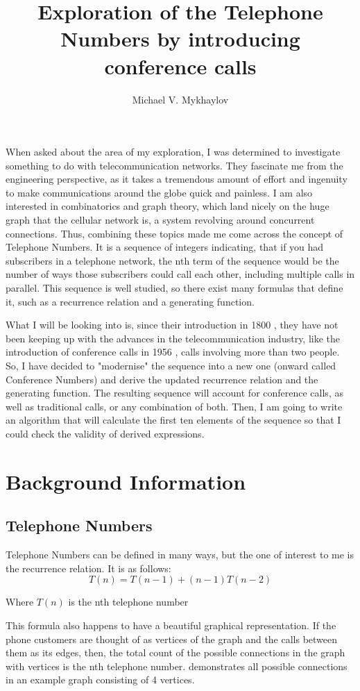 \documentclass[stu, 11pt, a4paper, floatsintext]{apa7}
\title{Exploration of the Telephone Numbers by introducing conference calls}
\author{Michael V. Mykhaylov}
\begin{document}
	\maketitle
	When asked about the area of my exploration, I was determined to investigate something to do with telecommunication networks. They fascinate me from the engineering perspective, as it takes a tremendous amount of effort and ingenuity to make communications around the globe quick and painless. I am also interested in combinatorics and graph theory, which land nicely on the huge graph that the cellular network is, a system revolving around concurrent connections. Thus, combining these topics made me come across the concept of Telephone Numbers. It is a sequence of integers indicating, that if you had  subscribers in a telephone network, the nth term of the sequence would be the number of ways those subscribers could call each other, including multiple calls in parallel. This sequence is well studied, so there exist many formulas that define it, such as a recurrence relation and a generating function.
	
	What I will be looking into is, since their introduction in 1800 \Parencite{knuth_art_1998}, they have not been keeping up with the advances in the telecommunication industry, like the introduction of conference calls in 1956 \Parencite{nathalie_gosset_when_2017}, calls involving more than two people. So, I have decided to "modernise" the sequence into a new one (onward called Conference Numbers) and derive the updated recurrence relation and the generating function. The resulting sequence will account for conference calls, as well as traditional calls, or any combination of both. Then, I am going to write an algorithm that will calculate the first ten elements of the sequence so that I could check the validity of derived expressions.
	\section{Background Information}
	\subsection{Telephone Numbers}
	Telephone Numbers can be defined in many ways, but the one of interest to me is the recurrence relation. It is as follows:
	\begin{equation}
		\label{eq01:tel_numbers_recurrence}
		T(n)=T(n-1)+(n-1)T(n-2)
	\end{equation}
	\begin{center}
		Where $T(n)$ is the nth telephone number
	\end{center}
	This formula also happens to have a beautiful graphical representation. If the phone customers are thought of as vertices of the graph and the calls between them as its edges, then, the total count of the possible connections in the graph with  vertices is the nth telephone number.  demonstrates all possible connections in an example graph consisting of 4 vertices.
	
\end{document}
